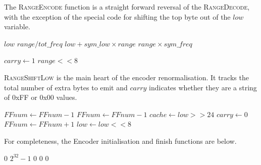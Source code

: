 \documentclass[a4paper]{article}
\begin{document}
The \textsc{RangeEncode} function is a straight forward reversal of the \textsc{RangeDecode}, with the exception of the special code for shifting the top byte out of the $low$ variable.

\begin{algorithmic}[1]
  \settowidth{\maxwidth}{old\_low\ }
  \State {} $low$
  \State {} $range / tot\_freq$
  \State {} $low + sym\_low \times range$
  \State {} $range \times sym\_freq$

  \Statex
    \State $carry \gets 1$ 
  \EndIf
   
    \settowidth{\maxwidth}{range\ }
    \State {} $range << 8$
    \State {}
  \EndWhile
\EndProcedure
\end{algorithmic}

\textsc{RangeShiftLow} is the main heart of the encoder renormalisation.
It tracks the total number of extra bytes to emit and $carry$ indicates whether they are a string of 0xFF or 0x00 values.

\begin{algorithmic}[1]
      \State {} 
        \State {}
        \State $FFnum \gets FFnum - 1$
      \EndWhile
    \Else
      \State {} 
        \State {}
        \State $FFnum \gets FFnum - 1$
      \EndWhile
    \EndIf
    \State $cache \gets low >> 24$ 
    \State $carry \gets 0$
  \Else
    \State $FFnum \gets FFnum + 1$
  \EndIf
  \Statex
  \State $low \gets low << 8$
\EndProcedure
\end{algorithmic}

For completeness, the Encoder initialisation and finish functions are below.

\begin{algorithmic}[1]
  \settowidth{\maxwidth}{FFnum\ }
  \State {} $0$
  \State {} $2^{32}-1$
  \State {} $0$
  \State {} $0$
  \State {} $0$
\EndProcedure
\end{algorithmic}
\end{document}
